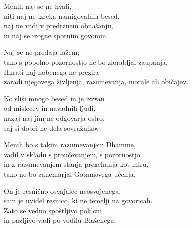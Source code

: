 Menih naj se ne hvali,\\
niti naj ne izreka namigovalnih besed,\\
naj ne vadi v predrznem obnašanju,\\
in naj se izogne spornim govorom.

Naj se ne predaja lažem;\\
tako s popolno pozornostjo ne bo zlorabljal zaupanja.\\
Hkrati naj nobenega ne prezira\\
zaradi njegovega življenja, razumevanja, morale ali običajev.

Ko sliši mnogo besed in je izzvan\\
od mislecev in navadnih ljudi,\\
nazaj naj jim ne odgovarja ostro,\\
saj si dobri ne dela sovražnikov.

Menih bo s takim razumevanjem Dhamme,\\
vadil v skladu s proučevanjem, s pozornostjo\\
in z razumevanjem stanja prenehanja kot miru,\\
tako ne bo zanemarjal Gotamovega učenja.

\clearpage

On je resnično osvajalec neosvojenega,\\
sam je uvidel resnico, ki ne temelji na govoricah.\\
Zato se vedno spoštljivo pokloni\\
in pazljivo vadi po vodilu Blaženega.

